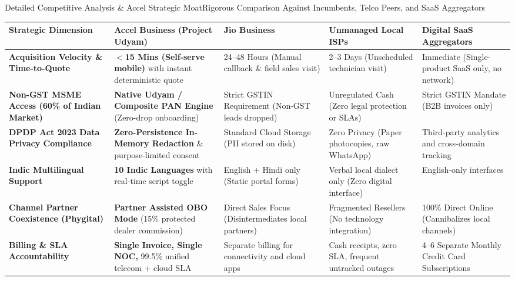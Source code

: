 \documentclass[aspectratio=169,10pt]{beamer}
\begin{document}
\begin{frame}{Detailed Competitive Analysis \& Accel Strategic Moat}{Rigorous Comparison Against Incumbents, Telco Peers, and SaaS Aggregators}
  \begin{tcolorbox}[academicbox]
    \centering
    {\fontsize{5.2pt}{6.4pt}\selectfont
    \begin{tabularx}{\linewidth}{p{2.3cm}XXXX}
      \toprule
      \textbf{Strategic Dimension} & \textbf{Accel Business (Project Udyam)} & \textbf{Jio Business} & \textbf{Unmanaged Local ISPs} & \textbf{Digital SaaS Aggregators} \\
      \midrule
      \textbf{Acquisition Velocity \& Time-to-Quote} & \textbf{$<$15 Mins (Self-serve mobile)} with instant deterministic quote & 24--48 Hours (Manual callback \& field sales visit) & 2--3 Days (Unscheduled technician visit) & Immediate (Single-product SaaS only, no network) \\
      \addlinespace[1pt]
      \textbf{Non-GST MSME Access (60\% of Indian Market)} & \textbf{Native Udyam / Composite PAN Engine} (Zero-drop onboarding) & Strict GSTIN Requirement (Non-GST leads dropped) & Unregulated Cash (Zero legal protection or SLAs) & Strict GSTIN Mandate (B2B invoices only) \\
      \addlinespace[1pt]
      \textbf{DPDP Act 2023 Data Privacy Compliance} & \textbf{Zero-Persistence In-Memory Redaction} \& purpose-limited consent & Standard Cloud Storage (PII stored on disk) & Zero Privacy (Paper photocopies, raw WhatsApp) & Third-party analytics and cross-domain tracking \\
      \addlinespace[1pt]
      \textbf{Indic Multilingual Support} & \textbf{10 Indic Languages} with real-time script toggle & English + Hindi only (Static portal forms) & Verbal local dialect only (Zero digital interface) & English-only interfaces \\
      \addlinespace[1pt]
      \textbf{Channel Partner Coexistence (Phygital)} & \textbf{Partner Assisted OBO Mode} (15\% protected dealer commission) & Direct Sales Focus (Disintermediates local partners) & Fragmented Resellers (No technology integration) & 100\% Direct Online (Cannibalizes local channels) \\
      \addlinespace[1pt]
      \textbf{Billing \& SLA Accountability} & \textbf{Single Invoice, Single NOC,} 99.5\% unified telecom + cloud SLA & Separate billing for connectivity and cloud apps & Cash receipts, zero SLA, frequent untracked outages & 4--6 Separate Monthly Credit Card Subscriptions \\
      \bottomrule
    \end{tabularx}
    }
  \end{tcolorbox}


\end{frame}
\end{document}
